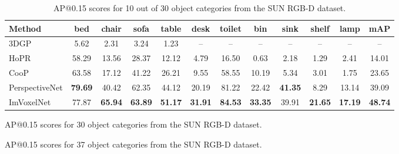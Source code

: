 \documentclass[10pt,twocolumn,letterpaper]{article}
\begin{document}
\begin{table*}[!ht]
    \centering \small
    \begingroup \setlength{\tabcolsep}{2pt}
    \begin{tabular}{l|cccccccccc|c}
    \hline
    Method & bed & chair & sofa & table & desk & toilet & bin & sink & shelf & lamp & mAP \\ \hline
    3DGP\cite{choi20133dgp} & \phantom{0}5.62 & \phantom{0}2.31 & \phantom{0}3.24 & \phantom{0}1.23 & -- & -- & -- & -- & -- & -- & -- \\
    HoPR\cite{huang2018holistic} & 58.29 & 13.56 & 28.37 & 12.12 & \phantom{0}4.79 & 16.50 & \phantom{0}0.63 & \phantom{0}2.18 & \phantom{0}1.29 & \phantom{0}2.41 & 14.01 \\
    CooP\cite{huang2018cooperative} & 63.58 & 17.12 & 41.22 & 26.21 & \phantom{0}9.55 & 58.55 & 10.19 & \phantom{0}5.34 & \phantom{0}3.01 & \phantom{0}1.75 & 23.65 \\
    PerspectiveNet\cite{huang2019perspectivenet} & \textbf{79.69} & 40.42 & 62.35 & 44.12 & 20.19 & 81.22 & 22.42 & \textbf{41.35} & 8.29 & 13.14 & 39.09 \\
    ImVoxelNet & 77.87 & \textbf{65.94} & \textbf{63.89} & \textbf{51.17} & \textbf{31.91} & \textbf{84.53} & \textbf{33.35} & 39.91 & \textbf{21.65} & \textbf{17.19} & \textbf{48.74} \\ \hline
    \end{tabular} \endgroup
    \caption{AP@0.15 scores for 10 out of 30 object categories \cite{huang2019perspectivenet} from the SUN RGB-D dataset.}
    \label{tab:sunrgbd_perspective_10}
\end{table*}

\begin{table*}[!ht]
    \centering \small
    \begingroup \setlength{\tabcolsep}{2pt}  \endgroup
    \caption{AP@0.15 scores for 30 object categories \cite{huang2019perspectivenet} from the SUN RGB-D dataset.}
    \label{tab:sunrgbd_perspective_30}
\end{table*}

\begin{table*}[!ht]
    \centering \small
    \begingroup \setlength{\tabcolsep}{2pt}  \endgroup
    \caption{AP@0.15 scores for 37 object categories \cite{nie2020total3dunderstanding} from the SUN RGB-D dataset.}
    \label{tab:sunrgbd_total_37}
\end{table*}
\end{document}
